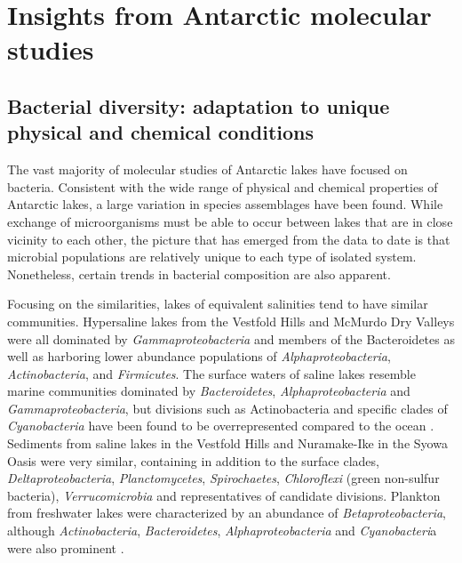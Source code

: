 
\section{Insights from Antarctic molecular studies}
\label{in:insights}
\subsection{Bacterial diversity: adaptation to unique physical and chemical conditions}
The vast majority of molecular studies of Antarctic lakes have focused on bacteria.
Consistent with the wide range of physical and chemical properties of Antarctic lakes, a large variation in species assemblages have been found.
While exchange of microorganisms must be able to occur between lakes that are in close vicinity to each other, 
the picture that has emerged from the data to date is that microbial populations are relatively unique to each type of isolated system. 
Nonetheless, certain trends in bacterial composition are also apparent.

Focusing on the similarities, lakes of equivalent salinities tend to have similar communities.
Hypersaline lakes from the Vestfold Hills \cite{Bowman2000a} and McMurdo Dry Valleys \cite{Glatz2006, Mosier2007} were all dominated by \emph{Gammaproteobacteria} and members of the Bacteroidetes
 as well as harboring lower abundance populations of \emph{Alphaproteobacteria}, \emph{Actinobacteria}, and \emph{Firmicutes}.
The surface waters of saline lakes resemble marine communities dominated by \emph{Bacteroidetes}, \emph{Alphaproteobacteria} and \emph{Gammaproteobacteria},
 but divisions such as Actinobacteria and specific clades of \emph{Cyanobacteria} have been found to be overrepresented compared to the ocean \cite{Lauro2011}.
Sediments from saline lakes in the Vestfold Hills \cite{Bowman2000} and Nuramake-Ike in the Syowa Oasis \cite{Kurosawa2010} were very similar, 
containing in addition to the surface clades, \emph{Deltaproteobacteria}, \emph{Planctomycetes}, \emph{Spirochaetes}, \emph{Chloroflexi} (green non-sulfur bacteria), \emph{Verrucomicrobia} and representatives of candidate divisions.
Plankton from freshwater lakes were characterized by an abundance of \emph{Betaproteobacteria}, although \emph{Actinobacteria}, \emph{Bacteroidetes}, \emph{Alphaproteobacteria} and \emph{Cyanobacteri}a were also prominent \cite{Pearce2003, Pearce2005, Pearce2005, Schiaffino2009}. 

